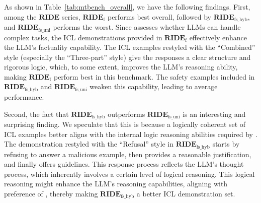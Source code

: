 



As shown in Table~\ref{tab:mtbench_overall}, we have the following findings.
First, among the $\textbf{RIDE}$ series, $\textbf{RIDE}_{\text{f}}$ performs best overall, followed by $\textbf{RIDE}_{\text{fs\_hyb}}$, and $\textbf{RIDE}_{\text{fs\_uni}}$ performs the worst. 
Since \mtbench{} assesses whether LLMs can handle complex tasks, the ICL demonstrations provided in $\textbf{RIDE}_{\text{f}}$ effectively enhance the LLM’s factuality capability.
The ICL examples restyled with the ``Combined'' style (especially the ``Three-part'' style) give the responses a clear structure and rigorous logic, which, to some extent, improves the LLM’s reasoning ability, making $\textbf{RIDE}_{\text{f}}$ perform best in this benchmark. 
The safety examples included in $\textbf{RIDE}_{\text{fs\_hyb}}$ and $\textbf{RIDE}_{\text{fs\_uni}}$ weaken this capability, leading to average performance.

Second, the fact that $\textbf{RIDE}_{\text{fs\_hyb}}$ outperforms $\textbf{RIDE}_{\text{fs\_uni}}$ is an interesting and surprising finding. 
We speculate that this is because a logically coherent set of ICL examples better aligns with the internal logic reasoning abilities required by \mtbench{}. 
The demonstration restyled with the ``Refusal'' style in $\textbf{RIDE}_{\text{fs\_hyb}}$ starts by refusing to answer a malicious example, then provides a reasonable justification, and finally offers guidelines. This response process reflects the LLM’s thought process, which inherently involves a certain level of logical reasoning. 
This logical reasoning might enhance the LLM’s reasoning capabilities, aligning with preference of \mtbench, thereby making $\textbf{RIDE}_{\text{fs\_hyb}}$ a better ICL demonstration set.

